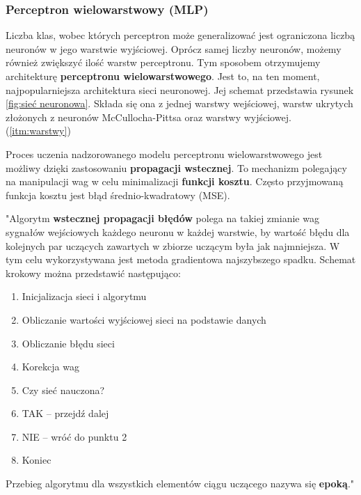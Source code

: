 \subsubsection{Perceptron wielowarstwowy (MLP)}

Liczba klas, wobec których perceptron może generalizować jest ograniczona liczbą neuronów w jego warstwie wyjściowej. Oprócz samej liczby neuronów, możemy również zwiększyć ilość warstw perceptronu. Tym sposobem otrzymujemy architekturę \textbf{perceptronu wielowarstwowego}. Jest to, na ten moment, najpopularniejsza architektura sieci neuronowej. Jej schemat przedstawia rysunek \ref{fig:sieć neuronowa}. Składa się ona z jednej warstwy wejściowej, warstw ukrytych złożonych z neuronów McCullocha-Pittsa oraz warstwy wyjściowej. (\ref{itm:warstwy})

Proces uczenia nadzorowanego modelu perceptronu wielowarstwowego jest możliwy dzięki zastosowaniu \textbf{propagacji wstecznej}. To mechanizm polegający na manipulacji wag w celu minimalizacji \textbf{funkcji kosztu}. Często przyjmowaną funkcja kosztu jest błąd średnio-kwadratowy (MSE).

\begin{description}

    \item"\null{}Algorytm \textbf{wstecznej propagacji błędów} polega na takiej zmianie wag sygnałów wejściowych każdego neuronu w każdej warstwie, by wartość błędu dla kolejnych par uczących zawartych w zbiorze uczącym była jak najmniejsza. W tym celu wykorzystywana jest metoda gradientowa najszybszego spadku.
    Schemat krokowy można przedstawić następująco:
    \begin{enumerate}
        \item Inicjalizacja sieci i algorytmu
        \item Obliczanie wartości wyjściowej sieci na podstawie danych
        \item Obliczanie błędu sieci
        \item Korekcja wag
        \item Czy sieć nauczona?
        \item TAK – przejdź dalej
        \item NIE – wróć do punktu 2
        \item Koniec
    \end{enumerate}

    \item Przebieg algorytmu dla wszystkich elementów ciągu uczącego nazywa się \textbf{epoką}." \cite{webarchive}
\end{description}

